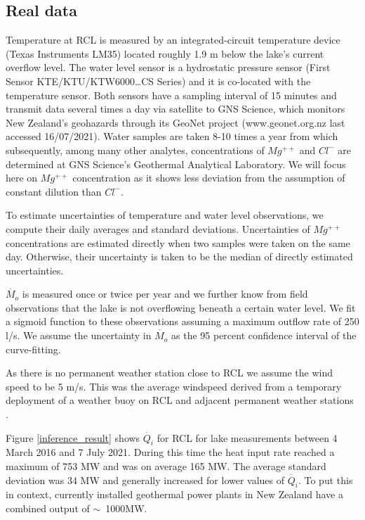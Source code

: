\documentclass{bmcart}
\begin{document}
\subsection{Real data}\label{realdata}
Temperature at RCL is measured by an integrated-circuit temperature device
(Texas Instruments LM35) located roughly 1.9 m below the lake's current
overflow level. The water level sensor is a hydrostatic pressure sensor (First
Sensor KTE/KTU/KTW6000\ldots CS Series) and it is co-located with the
temperature sensor. Both sensors have a sampling interval of 15 minutes and
transmit data several times a day via satellite to GNS Science, which monitors
New Zealand's geohazards through its GeoNet project (www.geonet.org.nz
 last accessed 16/07/2021).
Water samples are taken 8-10 times a year from which subsequently, among many
other analytes, concentrations of $Mg^{++}$ and $Cl^-$ are determined at GNS
Science's Geothermal Analytical Laboratory. We will focus here on $Mg^{++}$
concentration as it shows less deviation from the assumption of constant
dilution than $Cl^-$.
 
To estimate uncertainties of temperature and water level observations, we 
compute their daily averages and standard deviations. Uncertainties of $Mg^{++}$
concentrations are estimated directly when two samples were taken on the same day.
Otherwise, their uncertainty is taken to be the median of directly estimated
uncertainties. 

$\dot{M_o}$ is measured once or twice per year and we further know from field
observations that the lake is not overflowing beneath a certain water level. We
fit a sigmoid function to these observations assuming a maximum outflow rate of
250 l/s. We assume the uncertainty in $\dot{M_o}$ as the 95 percent confidence
interval of the curve-fitting.

As there is no permanent weather station close to RCL we assume the wind speed
to be 5 m/s. This was the average windspeed derived from a temporary deployment
of a weather buoy on RCL and adjacent permanent weather stations
\cite{hurstUseWeatherBuoy2012}.

Figure \ref{inference_result} shows $\dot{Q_i}$ for RCL for lake measurements
between 4 March 2016 and 7 July 2021. During this time the heat input rate
reached a maximum of 753 MW and was on average 165 MW. The average standard
deviation was 34 MW and generally increased for lower values of $\dot{Q_i}$. To
put this in context, currently installed geothermal power plants in New Zealand
have a combined output of $\sim$~1000MW.
\end{document}
